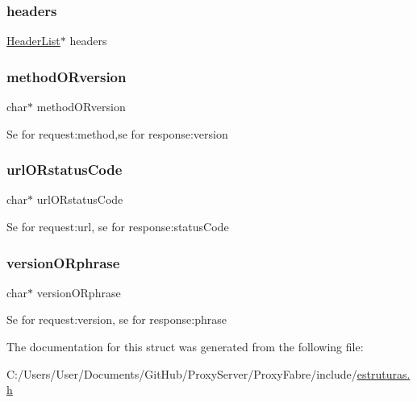 \subsubsection{\texorpdfstring{headers}{headers}}
{\footnotesize\ttfamily \hyperlink{estruturas_8h_a8a8b4f2337bacf921c5b455f8be7b6e4}{Header\+List}$\ast$ headers}

\mbox{\label{structrequestORresponse_aa1d8553b3a16d324fb272a867976c00d}} 
\subsubsection{\texorpdfstring{method\+O\+Rversion}{methodORversion}}
{\footnotesize\ttfamily char$\ast$ method\+O\+Rversion}

Se for request\+:method,se for response\+:version \mbox{\label{structrequestORresponse_ad622142f835fc5e4cf0e16123e2644c4}} 
\subsubsection{\texorpdfstring{url\+O\+Rstatus\+Code}{urlORstatusCode}}
{\footnotesize\ttfamily char$\ast$ url\+O\+Rstatus\+Code}

Se for request\+:url, se for response\+:status\+Code \mbox{\label{structrequestORresponse_a53a6db96ab378de64a27324ebdb8eab8}} 
\subsubsection{\texorpdfstring{version\+O\+Rphrase}{versionORphrase}}
{\footnotesize\ttfamily char$\ast$ version\+O\+Rphrase}

Se for request\+:version, se for response\+:phrase 

The documentation for this struct was generated from the following file\+:\begin{DoxyCompactItemize}
\item 
C\+:/\+Users/\+User/\+Documents/\+Git\+Hub/\+Proxy\+Server/\+Proxy\+Fabre/include/\hyperlink{estruturas_8h}{estruturas.\+h}\end{DoxyCompactItemize}
